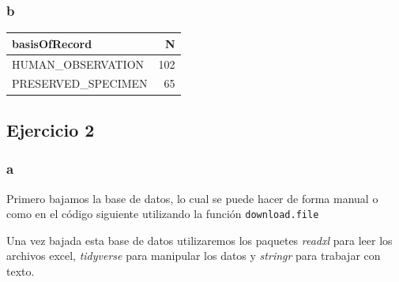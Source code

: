 \documentclass[]{book}
\newenvironment{Shaded}{\begin{snugshade}}{\end{snugshade}}
\newcommand{\DataTypeTok}[1]{\textcolor[rgb]{0.13,0.29,0.53}{#1}}
\newcommand{\KeywordTok}[1]{\textcolor[rgb]{0.13,0.29,0.53}{\textbf{#1}}}
\newcommand{\NormalTok}[1]{#1}
\newcommand{\OperatorTok}[1]{\textcolor[rgb]{0.81,0.36,0.00}{\textbf{#1}}}
\newcommand{\StringTok}[1]{\textcolor[rgb]{0.31,0.60,0.02}{#1}}
\begin{document}
\hypertarget{b}{%
\subsubsection{b}\label{b}}

\begin{Shaded}
\end{Shaded}

\begin{tabular}{l|r}
\hline
basisOfRecord & N\\
\hline
HUMAN\_OBSERVATION & 102\\
\hline
PRESERVED\_SPECIMEN & 65\\
\hline
\end{tabular}

\hypertarget{ejercicio-2-3}{%
\subsection{Ejercicio 2}\label{ejercicio-2-3}}

\hypertarget{a-1}{%
\subsubsection{a}\label{a-1}}

Primero bajamos la base de datos, lo cual se puede hacer de forma manual
o como en el código siguiente utilizando la función
\texttt{download.file}

\begin{Shaded}
\end{Shaded}

Una vez bajada esta base de datos utilizaremos los paquetes
\emph{readxl} para leer los archivos excel, \emph{tidyverse} para
manipular los datos y \emph{stringr} para trabajar con texto.
\end{document}
